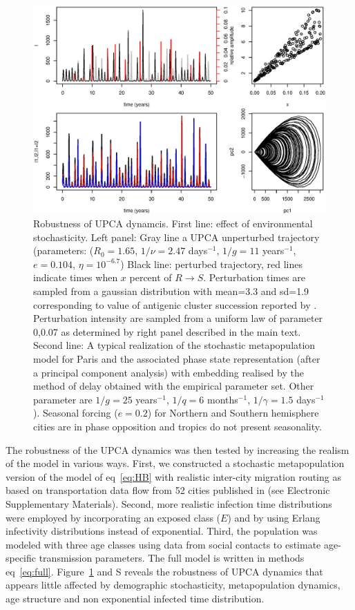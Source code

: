 \documentclass[12pt]{article}
\begin{document}
\begin{figure}[htp]
  \center
    \includegraphics[width= 0.8 \linewidth]{graph/pert.eps}
    \caption{Robustness of UPCA dynamcis.
      First line: effect of environmental stochasticity. Left panel:
      Gray line a UPCA unperturbed trajectory (parameters:
      ($R_0=1.65$, $1/\nu=2.47$ days$^{-1}$, $1/g=11$ years$^{-1}$,
      $e=0.104$, $\eta=10^{-6.7}$) Black line: perturbed trajectory,
      red lines indicate times when $x$ percent of $R \to
      S$. Perturbation times are sampled from a gaussian distribution
      with mean=3.3 and sd=1.9 corresponding to value of antigenic
      cluster succession reported by \citep{Smith2004}. Perturbation
      intensity are sampled from a uniform law of parameter 0,0.07 as
      determined by right panel described in the main text.
      Second line: A typical realization of the stochastic
      metapopulation model for Paris and the associated phase state
      representation (after a principal component analysis) with
      embedding realised by the method of delay obtained with the
      empirical parameter set. Other parameter are $1/g=25$
      years$^{-1}$, $1/q=6$ months$^{-1}$, $1/ \gamma=1.5$
      days$^{-1}$). Seasonal forcing ($e=0.2$) for Northern and
      Southern hemisphere cities are in phase opposition and tropics
      do not present seasonality.}
  \label{fig:pert}
\end{figure}

The robustness of the UPCA dynamics was then tested by increasing the
realism of the model in various ways.  First, we constructed a
stochastic metapopulation version of the model of eq~\eqref{eq:HB}
with realistic inter-city migration routing as based on transportation
data flow from 52 cities published in \citep{Grais2003} (see
Electronic Supplementary Materials). Second, more realistic infection
time distributions were employed by incorporating an exposed class
($E$) and by using Erlang infectivity distributions instead of
exponential. Third, the population was modeled with three age classes
using \citet{Wallinga2006} data from social contacts to estimate
age-specific transmission parameters. The full model is written in
methods eq~\eqref{eq:full}.  Figure~\ref{fig:pert} and S reveals the
robustness of UPCA dynamics that appears little affected by
demographic stochasticity, metapopulation dynamics, age structure and
non exponential infected time distribution.
\end{document}
